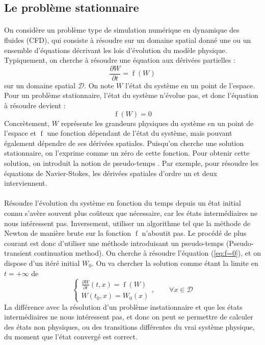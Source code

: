 	\subsection{Le problème stationnaire}

		\paragraph{}
		On considère un problème type de simulation numérique en dynamique des fluides (CFD), qui consiste à résoudre sur un domaine spatial donné une ou un ensemble d'équations décrivant les lois d'évolution du modèle physique.
		Typiquement, on cherche à résoudre une équation aux dérivées partielles :
		$$\frac{\partial W}{\partial t} = \operatorname{f}\left(W\right)$$
		sur un domaine spatial $\mathcal{D}$.
		On note $W$ l'état du système en un point de l'espace.
		Pour un problème stationnaire, l'état du système n'évolue pas, et donc l'équation à résoudre devient :
		\begin{equation}\label{eq:f=0}
			\operatorname{f}\left(W\right) = 0
		\end{equation}
		Concrètement, $W$ représente les grandeurs physiques du système en un point de l'espace et $\operatorname{f}$ une fonction dépendant de l'état du système, mais pouvant également dépendre de ses dérivées spatiales.
		Puisqu'on cherche une solution stationnaire, on l'exprime comme un zéro de cette fonction.
		Pour obtenir cette solution, on introduit la notion de pseudo-temps \cite{KelleyKeyes1996}.
		Par exemple, pour résoudre les équations de Navier-Stokes, les dérivées spatiales d'ordre un et deux interviennent.

		\paragraph{}
		Résoudre l'évolution du système en fonction du temps depuis un état initial connu s'avère souvent plus coûteux que nécessaire, car les états intermédiaires ne nous intéressent pas.
		Inversement, utiliser un algorithme tel que la méthode de Newton de manière brute sur la fonction $\operatorname{f}$ n'aboutit pas.
		Le procédé de plus courant est donc  d'utiliser une méthode introduisant un pseudo-temps (Pseudo-transient continuation method).
		On cherche à résoudre l'équation (\ref{eq:f=0}), et on dispose d'un itéré initial $W_0$.
		On va chercher la solution comme étant la limite en $t = +\infty$ de
		\begin{equation}\label{eq:edp}
			\left\{\begin{aligned}
				\frac{\partial W}{\partial t}\left(t, x\right) = \operatorname{f}\left(W\right) \\
				W\left(t_0, x\right) = W_0\left(x\right)
			\end{aligned}\right.,\qquad \forall x\in\mathcal{D}
		\end{equation}
		La différence avec la résolution d'un problème instationnaire et que les états intermédiaires ne nous intéressent pas, et donc on peut se permettre de calculer des états non physiques, ou des transitions différentes du vrai système physique, du moment que l'état convergé est correct.



